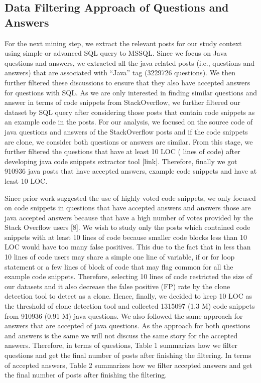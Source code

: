 \documentclass[conference]{IEEEtran}
\begin{document}
	
	\subsection{Data Filtering Approach of Questions and Answers}
	For the next mining step, we extract the relevant posts for our study context using simple or advanced SQL query to MSSQL. Since we focus on Java questions and answers, we extracted all the java related posts (i.e., questions and answers) that are associated with “Java” tag (3229726 questions). We then further filtered these discussions to ensure that they also have accepted answers for questions with SQL. As we are only interested in finding similar questions and answer in terms of code snippets from StackOverflow, we further filtered our dataset by SQL query after considering those posts that contain code snippets as  an example code in the posts. For our analysis, we focused on the source code of java questions and answers of the StackOverflow posts and if the code snippets are clone, we consider both questions or answers are similar. From this stage, we further filtered the questions that have at least 10 LOC ( lines of code) after developing java code snippets extractor tool [link]. Therefore,  finally we got 910936 java posts that have accepted answers, example code snippets and have at least 10 LOC. 
	
	Since prior work suggested the use of highly voted code snippets, we only focused on code snippets in questions that have accepted answers and answers those are java accepted answers because that have a high number of votes provided by the Stack Overflow users [8]. We wish to study only the posts which contained code snippets with at least 10 lines of code because smaller code blocks less than 10 LOC would have too many false positives. This due to the fact that in less than 10 lines of code users may share a simple one line of variable, if or for loop statement or a few lines of block of code that may flag common for all the example code snippets. Therefore, selecting 10 lines of code restricted the size of our datasets and it also decrease the false positive (FP) rate by the clone detection tool to detect as a clone. Hence, finally, we decided to keep 10 LOC as the threshold of clone detection tool and collected 1315097 (1.3 M) code snippets from 910936 (0.91 M) java questions. We also followed the same approach for answers that are accepted of java questions. As the approach for both questions and answers is the same we will not discuss the same story for the accepted answers. Therefore, in terms of questions, Table 1 summarizes how we filter questions and get the final number of posts after finishing the filtering. In terms of accepted answers, Table 2 summarizes how we filter accepted answers and get the final number of posts after finishing the filtering.
	
\end{document}
